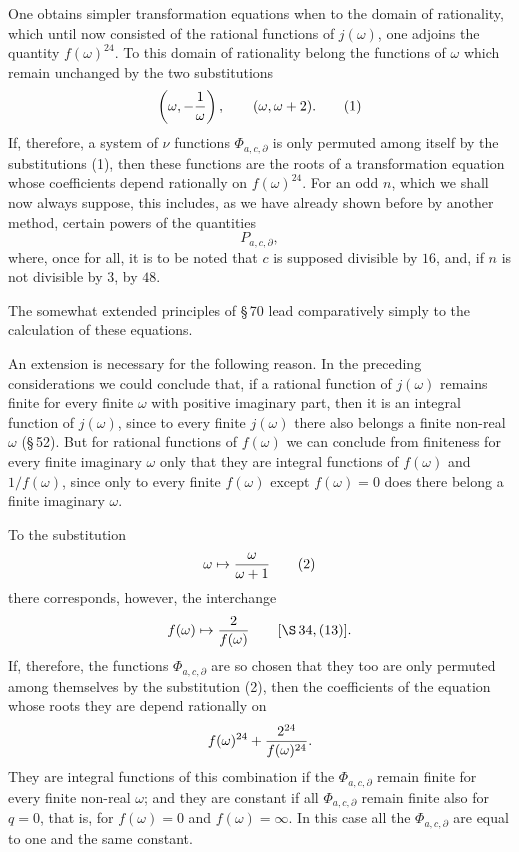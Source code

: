 \documentclass[11pt]{article}
\begin{document}
One obtains simpler transformation equations when to the domain of rationality, which until now consisted of the rational functions of $j(\omega)$, one adjoins the quantity $f(\omega)^{24}$. To this domain of rationality belong the functions of $\omega$ which remain unchanged by the two substitutions
\begin{equation}
 \left(\omega,-{1\over\omega}\right),
 \qquad
 (\omega,\omega+2).
\tag{1}
\end{equation}
If, therefore, a system of $\nu$ functions $\Phi_{a,c,\partial}$ is only permuted among itself by the substitutions (1), then these functions are the roots of a transformation equation whose coefficients depend rationally on $f(\omega)^{24}$. For an odd $n$, which we shall now always suppose, this includes, as we have already shown before by another method, certain powers of the quantities
\[
 P_{a,c,\partial},
\]
where, once for all, it is to be noted that $c$ is supposed divisible by $16$, and, if $n$ is not divisible by $3$, by $48$.

The somewhat extended principles of \S\,70 lead comparatively simply to the calculation of these equations.

An extension is necessary for the following reason. In the preceding considerations we could conclude that, if a rational function of $j(\omega)$ remains finite for every finite $\omega$ with positive imaginary part, then it is an integral function of $j(\omega)$, since to every finite $j(\omega)$ there also belongs a finite non-real $\omega$ (\S\,52). But for rational functions of $f(\omega)$ we can conclude from finiteness for every finite imaginary $\omega$ only that they are integral functions of $f(\omega)$ and $1/f(\omega)$, since only to every finite $f(\omega)$ except $f(\omega)=0$ does there belong a finite imaginary $\omega$.

To the substitution
\begin{equation}
 \omega\mapsto {\omega\over\omega+1}
\tag{2}
\end{equation}
there corresponds, however, the interchange
\[
 f(\omega)\mapsto {2\over f(\omega)}\qquad[\S\,34,(13)].
\]
If, therefore, the functions $\Phi_{a,c,\partial}$ are so chosen that they too are only permuted among themselves by the substitution (2), then the coefficients of the equation whose roots they are depend rationally on
\[
 f(\omega)^{24}+{2^{24}\over f(\omega)^{24}}.
\]
They are integral functions of this combination if the $\Phi_{a,c,\partial}$ remain finite for every finite non-real $\omega$; and they are constant if all $\Phi_{a,c,\partial}$ remain finite also for $q=0$, that is, for $f(\omega)=0$ and $f(\omega)=\infty$. In this case all the $\Phi_{a,c,\partial}$ are equal to one and the same constant.
\end{document}
